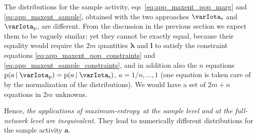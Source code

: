 \documentclass[\ifafour a4paper,12pt,\else a5paper,10pt,\fi%
onecolumn,oneside,article,%
british%
]{memoir}
\theoremstyle{remark}
\theoremstyle{innote}
\newcommand*{\pf}{\mathrm{p}}%
\renewcommand*{\|}{\nonscript\,\vert\nonscript\;\mathopen{}}
\newcommand*{\eqns}{eqs}%
\newcommand*{\yav}{a}
\newcommand*{\yaa}{\bm{\yav}}%
\newcommand*{\ya}{\yav}%
\newcommand*{\yHa}{\varIota_\textrm{p}}
\newcommand*{\yHb}{\varIota_\textrm{s}}
\newcommand*{\yL}{\bm{\lambda}}
\newcommand*{\yl}{\bm{l}}
\newcommand*{\me}{maximum-entropy}
\begin{document}
The distributions for the sample activity,
\eqns~\eqref{eq:app_maxent_pop_marg} and \eqref{eq:app_maxent_sample},
obtained with the two approaches $\yHb$ and $\yHa$, are different. From the
discussion in the previous section we expect them to be vaguely similar;
yet they cannot be exactly equal, because their equality would require the
$2m$ quantities $\yL$ and $\yl$ to satisfy the constraint equations
\eqref{eq:app_maxent_pop_constraints} and
\eqref{eq:app_maxent_sample_constraints}, and in addition also the $n$
equations $\pf(\ya \| \yHa) = \pf(\ya \| \yHb)$,
$\ya=1/n,\dotsc,1$ (one equation is taken care of by the normalization of
the distributions). We would have a set of $2m+n$ equations in $2m$
unknowns.

Hence, \emph{the applications of \me\ at the sample level and at the
  full-network level are inequivalent}. They lead to numerically
different distributions for the sample activity $\yaa$.
\end{document}
